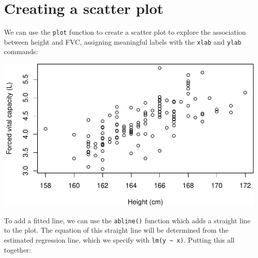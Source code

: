 \documentclass[
]{memoir}
\newenvironment{Shaded}{\begin{snugshade}}{\end{snugshade}}
\newcommand{\AttributeTok}[1]{\textcolor[rgb]{0.77,0.63,0.00}{#1}}
\newcommand{\FunctionTok}[1]{\textcolor[rgb]{0.00,0.00,0.00}{#1}}
\newcommand{\NormalTok}[1]{#1}
\newcommand{\SpecialCharTok}[1]{\textcolor[rgb]{0.00,0.00,0.00}{#1}}
\newcommand{\StringTok}[1]{\textcolor[rgb]{0.31,0.60,0.02}{#1}}
\begin{document}
\hypertarget{creating-a-scatter-plot}{%
\section{Creating a scatter plot}\label{creating-a-scatter-plot}}

We can use the \texttt{plot} function to create a scatter plot to explore the association between height and FVC, assigning meaningful labels with the \texttt{xlab} and \texttt{ylab} commands:

\begin{Shaded}
\end{Shaded}

\includegraphics{08.1-correlation-regression-R_files/figure-latex/unnamed-chunk-2-1.pdf}

To add a fitted line, we can use the \texttt{abline()} function which adds a straight line to the plot. The equation of this straight line will be determined from the estimated regression line, which we specify with \texttt{lm(y\ \textasciitilde{}\ x)}. Putting this all together:

\begin{Shaded}
\end{Shaded}
\end{document}
